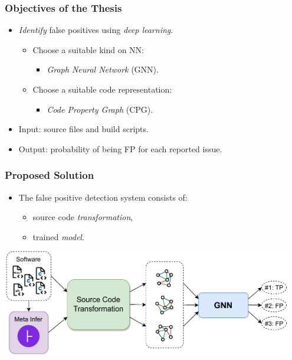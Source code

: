 \documentclass[10pt,xcolor=pdflatex,hyperref={unicode}]{beamer}
\begin{document}
\begin{frame}\frametitle{Objectives of the Thesis}
\doublespacing
    \begin{itemize}
        \item \emph{Identify} false positives using \emph{deep learning}.
        \begin{itemize}
            \item Choose a suitable kind on NN:
            \begin{itemize}
                \item \emph{Graph Neural Network} (GNN).
            \end{itemize}
            \item Choose a suitable code representation:
            \begin{itemize}
                \item \emph{Code Property Graph} (CPG).
            \end{itemize}
        \end{itemize}
        \item \alert{Input}: source files and build scripts.
        \item \alert{Output}: probability of being FP for each reported issue.
    \end{itemize}
\end{frame}


\begin{frame}\frametitle{Proposed Solution}
\doublespacing
    \begin{itemize}
        \item The false positive detection system consists of:
        \begin{itemize}
            \item source code \emph{transformation},
            \item trained \emph{model}.
        \end{itemize}
    \end{itemize}
    \vspace{0.7cm}
    \begin{center}
        \includegraphics[width=0.95\textwidth]{img/overall.drawio.pdf}
    \end{center}

\end{frame}
\end{document}

